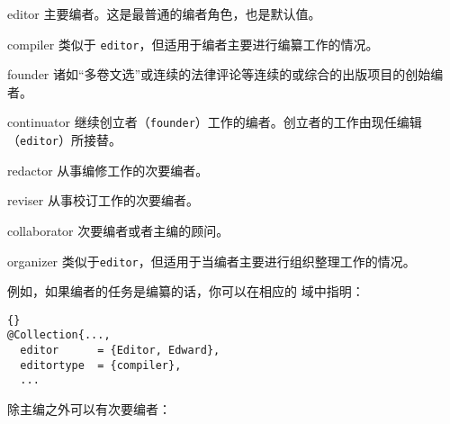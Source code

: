\begin{marglist}
	\setlength{\itemsep}{0pt}
	\item[editor] %
	主要编者。这是最普通的编者角色，也是默认值。

	\item[compiler] %
	类似于 \texttt{editor}，但适用于编者主要进行编纂工作的情况。

	\item[founder] %
	诸如“多卷文选”或连续的法律评论等连续的或综合的出版项目的创始编者。

	\item[continuator] %
	继续创立者（\texttt{founder}）工作的编者。创立者的工作由现任编辑（\texttt{editor}）所接替。

	\item[redactor] %
	从事编修工作的次要编者。

	\item[reviser] %
	从事校订工作的次要编者。

	\item[collaborator] %
	次要编者或者主编的顾问。

	\item[organizer] %
    类似于\texttt{editor}，但适用于当编者主要进行组织整理工作的情况。
\end{marglist}
%
例如，如果编者的任务是编纂的话，你可以在相应的  域中指明：

\begin{lstlisting}[style=bibtex]{}
@Collection{...,
  editor      = {Editor, Edward},
  editortype  = {compiler},
  ...
\end{lstlisting}
%
除主编之外可以有次要编者：


